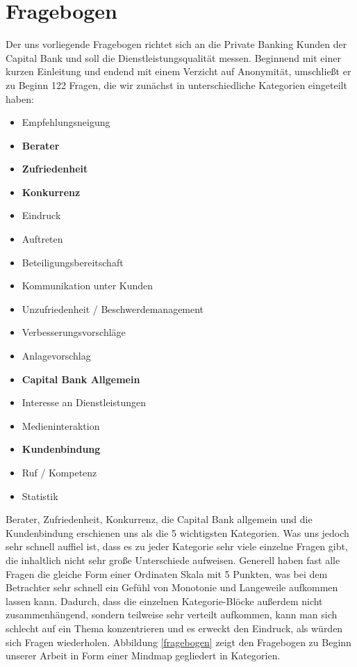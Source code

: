 \documentclass{article}\usepackage[]{graphicx}\usepackage[]{color}
\begin{document}
\section{Fragebogen}
Der uns vorliegende Fragebogen richtet sich an die Private Banking Kunden der Capital Bank und soll die Dienstleistungsqualität messen. 
Beginnend mit einer kurzen Einleitung und endend mit einem Verzicht auf Anonymität, umschließt er zu Beginn 122 Fragen, die wir zunächst in unterschiedliche Kategorien eingeteilt haben:
\begin{itemize}
\item Empfehlungsneigung
\item \textbf{Berater}
\item \textbf{Zufriedenheit}
\item \textbf{Konkurrenz}
\item Eindruck
\item Auftreten
\item Beteiligungsbereitschaft
\item Kommunikation unter Kunden
\item Unzufriedenheit / Beschwerdemanagement
\item Verbesserungsvorschläge
\item Anlagevorschlag
\item \textbf{Capital Bank Allgemein}
\item Interesse an Dienstleistungen
\item Medieninteraktion
\item \textbf{Kundenbindung}
\item Ruf / Kompetenz
\item Statistik
\end{itemize}
Berater, Zufriedenheit, Konkurrenz, die Capital Bank allgemein und die Kundenbindung erschienen uns als die 5 wichtigsten Kategorien. Was uns jedoch sehr schnell auffiel ist, dass es zu jeder Kategorie sehr viele einzelne Fragen gibt, die inhaltlich nicht sehr große Unterschiede aufweisen. Generell haben fast alle Fragen die gleiche Form einer Ordinaten Skala mit 5 Punkten, was bei dem Betrachter sehr schnell ein Gefühl von Monotonie und Langeweile aufkommen lassen kann. Dadurch, dass die einzelnen Kategorie-Blöcke außerdem nicht zusammenhängend, sondern teilweise sehr verteilt aufkommen, kann man sich schlecht auf ein Thema konzentrieren und es erweckt den Eindruck, als würden sich Fragen wiederholen. Abbildung \ref{fragebogen} zeigt den Fragebogen zu Beginn unserer Arbeit in Form einer Mindmap gegliedert in Kategorien.\\
\end{document}
